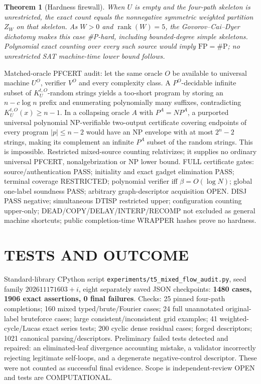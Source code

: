 \documentclass[11pt]{article}
\newtheorem{theorem}{Theorem}
\begin{document}
\begin{theorem}[Hardness firewall]
When $U$ is empty and the four-path skeleton is unrestricted, the exact count equals the nonnegative symmetric weighted partition $Z_W$ on that skeleton. As $W>0$ and $\operatorname{rank}(W)=5$, the Govorov--Cai--Dyer dichotomy makes this case #P-hard, including bounded-degree simple skeletons. Polynomial exact counting over every such source would imply $\mathrm{FP}=\#\mathrm P$; no unrestricted SAT machine-time lower bound follows.
\end{theorem}
Matched-oracle PFCERT audit: let the same oracle $O$ be available to universal machine $U^O$, verifier $V^O$ and every complexity class. A $P^O$-decidable infinite subset of $K_U^{t,O}$-random strings yields a too-short program by storing an $n-c\log n$ prefix and enumerating polynomially many suffixes, contradicting $K_U^{t,O}(x)\ge n-1$. In a collapsing oracle $A$ with $P^A=NP^A$, a purported universal polynomial NP-verifiable two-output certificate covering endpoints of every program $|p|\le n-2$ would have an NP envelope with at most $2^n-2$ strings, making its complement an infinite $P^A$ subset of the random strings. This is impossible. Restricted mixed-source counting relativizes; it supplies no ordinary universal PFCERT, nonalgebrization or NP lower bound. FULL certificate gates: source/authentication PASS; initiality and exact gadget elimination PASS; terminal coverage RESTRICTED; polynomial verifier iff $\beta=O(\log N)$; global one-label soundness PASS; arbitrary graph-descriptor acquisition OPEN. DISJ PASS negative; simultaneous DTISP restricted upper; configuration counting upper-only; DEAD/COPY/DELAY/INTERP/RECOMP not excluded as general machine shortcuts; public completion-time WRAPPER hashes prove no hardness.

\section{TESTS AND OUTCOME}
Standard-library CPython script \texttt{experiments/t5\_mixed\_flow\_audit.py}, seed family $202611171603+i$, eight separately saved JSON checkpoints: \textbf{1480 cases, 1906 exact assertions, 0 final failures}. Checks: 25 pinned four-path completions; 160 mixed typed/brute/Fourier cases; 24 full unannotated original-label bruteforce cases; large consistent/inconsistent grid examples; 41 weighted-cycle/Lucas exact series tests; 200 cyclic dense residual cases; forged descriptors; 1021 canonical parsing/descriptors. Preliminary failed tests detected and repaired: an eliminated-leaf divergence accounting mistake, a validator incorrectly rejecting legitimate self-loops, and a degenerate negative-control descriptor. These were not counted as successful final evidence. Scope is independent-review OPEN and tests are COMPUTATIONAL.
\end{document}
